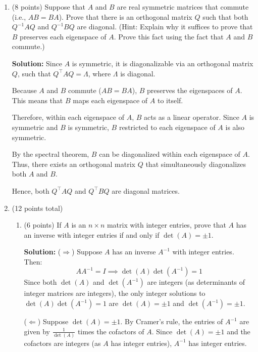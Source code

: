 \documentclass[12pt]{article}
\newcommand{\qspace}{\vspace{1em}} %
\newenvironment{solution}{\noindent\textbf{Solution:} }{\qspace}
\begin{document}
\begin{enumerate}
    \item (8 points) Suppose that \( A \) and \( B \) are real symmetric matrices that commute (i.e., \( AB = BA \)). Prove that there is an orthogonal matrix \( Q \) such that both \( Q^{-1} A Q \) and \( Q^{-1} B Q \) are diagonal. (Hint: Explain why it suffices to prove that \( B \) preserves each eigenspace of \( A \). Prove this fact using the fact that \( A \) and \( B \) commute.)
    
    \begin{solution}
    Since \( A \) is symmetric, it is diagonalizable via an orthogonal matrix \( Q \), such that \( Q^\top A Q = \Lambda \), where \( \Lambda \) is diagonal.

    Because \( A \) and \( B \) commute (\( AB = BA \)), \( B \) preserves the eigenspaces of \( A \). This means that \( B \) maps each eigenspace of \( A \) to itself.

    Therefore, within each eigenspace of \( A \), \( B \) acts as a linear operator. Since \( A \) is symmetric and \( B \) is symmetric, \( B \) restricted to each eigenspace of \( A \) is also symmetric.

    By the spectral theorem, \( B \) can be diagonalized within each eigenspace of \( A \). Thus, there exists an orthogonal matrix \( Q \) that simultaneously diagonalizes both \( A \) and \( B \).

    Hence, both \( Q^\top A Q \) and \( Q^\top B Q \) are diagonal matrices.
    \end{solution}
    
    \item (12 points total) 
    \begin{enumerate}
        \item (6 points) If \( A \) is an \( n \times n \) matrix with integer entries, prove that \( A \) has an inverse with integer entries if and only if \( \det(A) = \pm 1 \).
        
        \begin{solution}
        (\(\Rightarrow\)) Suppose \( A \) has an inverse \( A^{-1} \) with integer entries. Then:
        \[
        A A^{-1} = I \implies \det(A) \det(A^{-1}) = 1
        \]
        Since both \( \det(A) \) and \( \det(A^{-1}) \) are integers (as determinants of integer matrices are integers), the only integer solutions to \( \det(A) \det(A^{-1}) = 1 \) are \( \det(A) = \pm 1 \) and \( \det(A^{-1}) = \pm 1 \).

        (\(\Leftarrow\)) Suppose \( \det(A) = \pm 1 \). By Cramer's rule, the entries of \( A^{-1} \) are given by \( \frac{1}{\det(A)} \) times the cofactors of \( A \). Since \( \det(A) = \pm 1 \) and the cofactors are integers (as \( A \) has integer entries), \( A^{-1} \) has integer entries.
        \end{solution}
        

\end{enumerate}
\end{enumerate}
\end{document}

